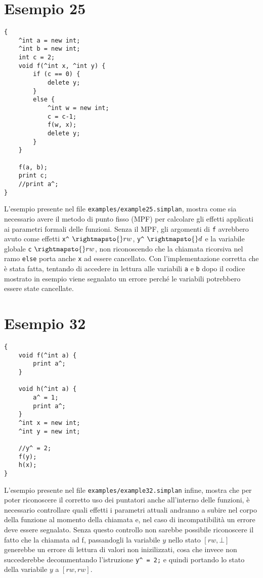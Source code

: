 \documentclass[../report.tex]{subfiles}
\begin{document}
\section{Esempio 25}\label{s:esempio25}
\begin{lstlisting}
{
    ^int a = new int;
    ^int b = new int;
    int c = 2;
    void f(^int x, ^int y) {
        if (c == 0) {
            delete y;
        }
        else {
            ^int w = new int;
            c = c-1;
            f(w, x);
            delete y;
        }
    }

    f(a, b);
    print c;
    //print a^;
}
\end{lstlisting}
L'esempio presente nel file \verb|examples/example25.simplan|, mostra come sia necessario avere il metodo di punto fisso (MPF) per calcolare gli effetti applicati ai parametri formali delle funzioni.
Senza il MPF, gli argomenti di \verb|f| avrebbero avuto come effetti \verb|x^| $\rightmapsto{} rw$, \verb|y^| $\rightmapsto{} d$ e la variabile globale \verb|c| $\rightmapsto{} rw$, non riconoscendo che la chiamata ricorsiva nel ramo \verb|else| porta anche \verb|x| ad essere cancellato.
Con l'implementazione corretta che è stata fatta, tentando di accedere in lettura alle variabili \verb|a| e \verb|b| dopo il codice mostrato in esempio viene segnalato un errore perché le variabili potrebbero essere state cancellate.

\section{Esempio 32}\label{s:esempio32}
\begin{lstlisting}
{
    void f(^int a) {
        print a^;
    }

    void h(^int a) {
        a^ = 1;
        print a^;
    }
    ^int x = new int;
    ^int y = new int;

    //y^ = 2;
    f(y);
    h(x);
}
\end{lstlisting}
L'esempio presente nel file \verb|examples/example32.simplan| infine, mostra che per poter riconoscere il corretto uso dei puntatori anche all'interno delle funzioni, \`e necessario controllare quali effetti i parametri attuali andranno a subire nel corpo della funzione al momento della chiamata e, nel caso di incompatibilit\`a un errore deve essere segnalato. Senza questo controllo non sarebbe possibile riconoscere il fatto che la chiamata ad f, passandogli la variabile $y$ nello stato $[rw, \bot]$ generebbe un errore di lettura di valori non inizilizzati, cosa che invece non succederebbe decommentando l'istruzione \verb|y^ = 2;| e quindi portando lo stato della variabile $y$ a $[rw, rw]$.
\end{document}
